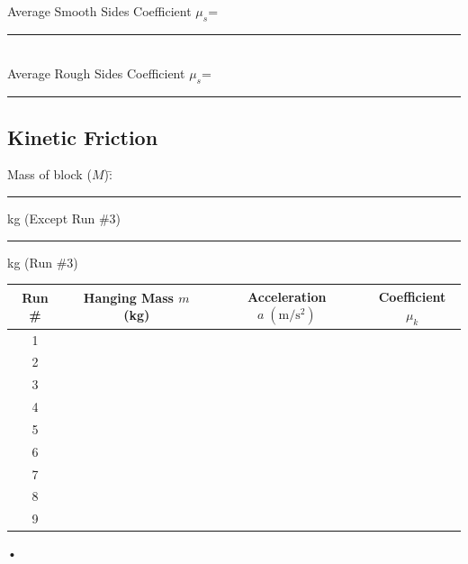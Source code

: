 \documentclass[main.tex]{subfiles}
\begin{document}
\begin{samepage}
\begin{doublespace}
\noindent
Average Smooth Sides Coefficient $\mu_s$=\rule[-1mm]{2.5cm}{.1pt}\\
Average Rough Sides Coefficient $\mu_s$=\rule[-1mm]{2.5cm}{.1pt}

\subsection*{Kinetic Friction}
\begin{tabbing}
Mass of block ($M$):\= \rule[-1mm]{2.5cm}{.1pt}kg (Except Run \#3)\\
\>\rule[-1mm]{2.5cm}{.1pt}kg (Run \#3)
\end{tabbing}



\begin{tabular}{|c|c|c|c|}
\hline
Run \# & Hanging Mass $m$ (kg) & Acceleration $a\; (\text{m}/\text{s}^2)$ & Coefficient $\mu_k$\\
\hline
1 &&&\\
\hline
2 &&&\\
\hline
3 &&&\\
\hline
4 &&&\\
\hline
5 &&&\\
\hline
6 &&&\\
\hline
7 &&&\\
\hline
8 &&&\\
\hline
9 &&&\\
\hline
\end{tabular}•
\end{doublespace}

\end{samepage}
\end{document}

